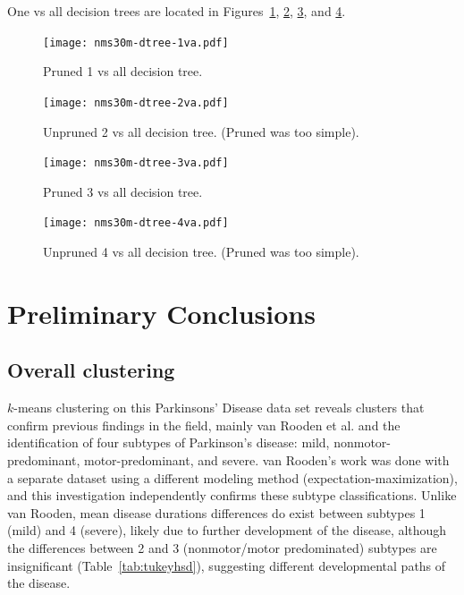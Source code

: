 \documentclass[10pt]{article}
\begin{document}
\begin{multicols}{2}
One vs all decision trees are located in
Figures~\ref{fig:nms30m-dtree-1va}, \ref{fig:nms30m-dtree-2va}, \ref{fig:nms30m-dtree-3va},
and \ref{fig:nms30m-dtree-4va}.

\begin{figure}[p]
  \centering
  \texttt{[image: nms30m-dtree-1va.pdf]}
  \caption{Pruned 1 vs all decision tree.}
  \label{fig:nms30m-dtree-1va}
\end{figure}

\begin{figure}[p]
  \centering
  \texttt{[image: nms30m-dtree-2va.pdf]}
  \caption{Unpruned 2 vs all decision tree. (Pruned was too simple).}
  \label{fig:nms30m-dtree-2va}
\end{figure}

\begin{figure}[p]
  \centering
  \texttt{[image: nms30m-dtree-3va.pdf]}
  \caption{Pruned 3 vs all decision tree.}
  \label{fig:nms30m-dtree-3va}
\end{figure}

\begin{figure}[p]
  \centering
  \texttt{[image: nms30m-dtree-4va.pdf]}
  \caption{Unpruned 4 vs all decision tree. (Pruned was too simple).}
  \label{fig:nms30m-dtree-4va}
\end{figure}
\section{Preliminary Conclusions}

\subsection{Overall clustering}
$k$-means clustering on this Parkinsons' Disease data set reveals clusters that confirm previous
findings in the field, mainly van Rooden et al. \cite{vanrooden10} and the identification of four
subtypes of Parkinson's disease: mild, nonmotor-predominant, motor-predominant, and severe.  van
Rooden's work was done with a separate dataset using a different modeling method
(expectation-maximization), and this investigation independently confirms these subtype
classifications. Unlike van Rooden, mean disease durations differences do exist between subtypes 1
(mild) and 4 (severe), likely due to further development of the disease, although the differences
between 2 and 3 (nonmotor/motor predominated) subtypes are insignificant
(Table~\ref{tab:tukeyhsd}), suggesting different developmental paths of the disease.


\end{multicols}
\end{document}
